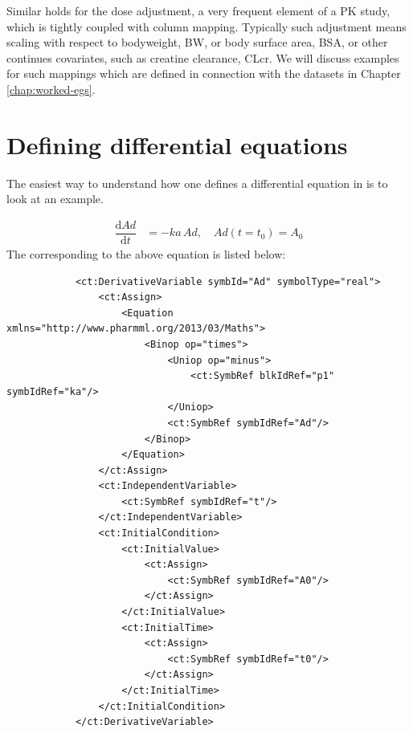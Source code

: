 Similar holds for the dose adjustment, a very frequent element of a PK study, 
which is tightly coupled with column mapping. Typically such adjustment 
means scaling with respect to bodyweight, BW, or body surface area, BSA, 
or other continues covariates, such as creatine clearance, CLcr. We will discuss 
examples for such mappings which are defined in connection with the datasets 
in Chapter \ref{chap:worked-egs}.


\section{Defining differential equations}
\label{sec:odes}

The easiest way to understand how one defines a differential equation in \pharmml
is to look at an example.

\begin{align*}
	\dfrac{\mathrm{d}\mathit{Ad}}{\mathrm{d}t}  &=  -\mathit{ka}\,  \mathit{Ad}, \quad \textit{Ad}(t=t_0)  =  A_0
\end{align*}
%
The corresponding \pharmml to the above equation is listed below:
%
\lstset{language=XML}
\begin{lstlisting}
            <ct:DerivativeVariable symbId="Ad" symbolType="real">
                <ct:Assign>
                    <Equation xmlns="http://www.pharmml.org/2013/03/Maths">
                        <Binop op="times">
                            <Uniop op="minus">
                                <ct:SymbRef blkIdRef="p1" symbIdRef="ka"/>
                            </Uniop>
                            <ct:SymbRef symbIdRef="Ad"/>
                        </Binop>
                    </Equation>
                </ct:Assign>
                <ct:IndependentVariable>
                    <ct:SymbRef symbIdRef="t"/>
                </ct:IndependentVariable>
                <ct:InitialCondition>
                    <ct:InitialValue>
                        <ct:Assign>
                            <ct:SymbRef symbIdRef="A0"/>
                        </ct:Assign>
                    </ct:InitialValue>
                    <ct:InitialTime>
                        <ct:Assign>
                            <ct:SymbRef symbIdRef="t0"/>
                        </ct:Assign>
                    </ct:InitialTime>
                </ct:InitialCondition>
            </ct:DerivativeVariable>
\end{lstlisting}


